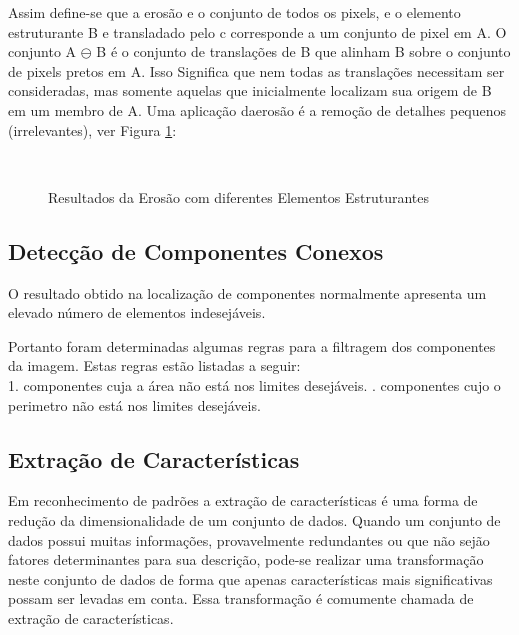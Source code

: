 \documentclass[letterpaper, 10 pt, conference]{ieeeconf}  %
\begin{document}
Assim define-se que a erosão e o conjunto de todos os pixels, e o elemento estruturante B e transladado pelo c corresponde a um conjunto de pixel em A. O conjunto A $\ominus$ B é o conjunto de translações de B que alinham B sobre o conjunto de pixels pretos em A. Isso Significa que nem todas as translações necessitam ser consideradas, mas somente aquelas que inicialmente localizam sua origem de B em um membro de A. Uma aplicação daerosão é a remoção de detalhes pequenos (irrelevantes),  ver Figura \ref{fig:Figura02}:

\begin{figure}[H]
\centering

\\


\caption{Resultados da Erosão com diferentes Elementos Estruturantes}
\label{fig:Figura02}
\end{figure}


\subsection{Detecção de Componentes Conexos}

O resultado obtido na localização de componentes normalmente apresenta um elevado número de elementos indesejáveis.

Portanto foram determinadas algumas regras para a filtragem dos componentes da imagem. Estas regras estão listadas a seguir:\\
1. componentes cuja a área não está nos limites desejáveis. . componentes cujo o perimetro não está nos limites desejáveis.\newline

\subsection{Extração de Características} 

Em reconhecimento de padrões a extração de características é uma forma de
redução da dimensionalidade de um conjunto de dados.
Quando um conjunto de dados possui muitas informações, provavelmente redundantes
ou que não sejão fatores determinantes para sua descrição, pode-se realizar uma
transformação neste conjunto de dados de forma que apenas características mais
significativas possam ser levadas em conta. Essa transformação é comumente
chamada de extração de características.
\end{document}

